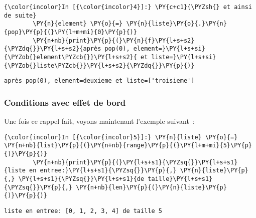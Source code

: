     \begin{Verbatim}[commandchars=\\\{\},frame=single,framerule=0.3mm,rulecolor=\color{cellframecolor}]
{\color{incolor}In [{\color{incolor}4}]:} \PY{c+c1}{\PYZsh{} et ainsi de suite}
        \PY{n}{element} \PY{o}{=} \PY{n}{liste}\PY{o}{.}\PY{n}{pop}\PY{p}{(}\PY{l+m+mi}{0}\PY{p}{)}
        \PY{n+nb}{print}\PY{p}{(}\PY{n}{f}\PY{l+s+s2}{\PYZdq{}}\PY{l+s+s2}{après pop(0), element=}\PY{l+s+si}{\PYZob{}element\PYZcb{}}\PY{l+s+s2}{ et liste=}\PY{l+s+si}{\PYZob{}liste\PYZcb{}}\PY{l+s+s2}{\PYZdq{}}\PY{p}{)}
\end{Verbatim}


    \begin{Verbatim}[commandchars=\\\{\},frame=single,framerule=0.3mm,rulecolor=\color{cellframecolor}]
après pop(0), element=deuxieme et liste=['troisieme']
\end{Verbatim}

    \hypertarget{conditions-avec-effet-de-bord}{%
\subsubsection{Conditions avec effet de
bord}\label{conditions-avec-effet-de-bord}}

    Une fois ce rappel fait, voyons maintenant l'exemple suivant~:

    \begin{Verbatim}[commandchars=\\\{\},frame=single,framerule=0.3mm,rulecolor=\color{cellframecolor}]
{\color{incolor}In [{\color{incolor}5}]:} \PY{n}{liste} \PY{o}{=} \PY{n+nb}{list}\PY{p}{(}\PY{n+nb}{range}\PY{p}{(}\PY{l+m+mi}{5}\PY{p}{)}\PY{p}{)}
        \PY{n+nb}{print}\PY{p}{(}\PY{l+s+s1}{\PYZsq{}}\PY{l+s+s1}{liste en entree:}\PY{l+s+s1}{\PYZsq{}}\PY{p}{,} \PY{n}{liste}\PY{p}{,} \PY{l+s+s1}{\PYZsq{}}\PY{l+s+s1}{de taille}\PY{l+s+s1}{\PYZsq{}}\PY{p}{,} \PY{n+nb}{len}\PY{p}{(}\PY{n}{liste}\PY{p}{)}\PY{p}{)}
\end{Verbatim}


    \begin{Verbatim}[commandchars=\\\{\},frame=single,framerule=0.3mm,rulecolor=\color{cellframecolor}]
liste en entree: [0, 1, 2, 3, 4] de taille 5
\end{Verbatim}

